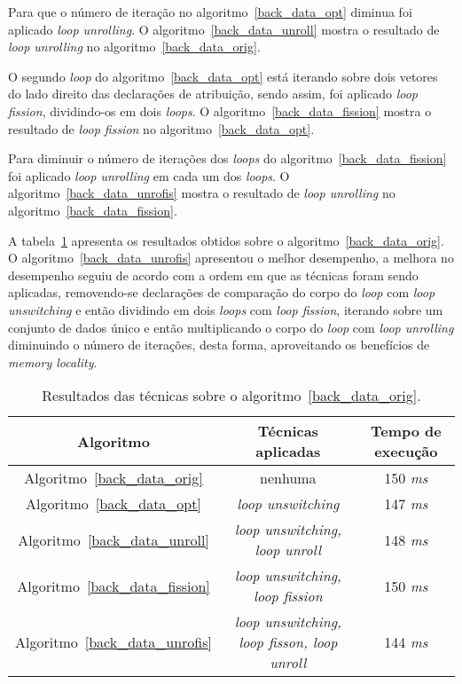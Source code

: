 Para que o número de iteração no algoritmo~\ref{back_data_opt} diminua foi
aplicado \textit{loop unrolling}. O algoritmo~\ref{back_data_unroll} mostra o
resultado de \textit{loop unrolling} no algoritmo~\ref{back_data_orig}.

O segundo \textit{loop} do algoritmo~\ref{back_data_opt} está iterando sobre dois
vetores do lado direito das declarações de atribuição, sendo assim, foi
aplicado \textit{loop fission}, dividindo-os em dois \textit{loops}.
O algoritmo~\ref{back_data_fission} mostra o resultado de \textit{loop fission}
no algoritmo~\ref{back_data_opt}.

Para diminuir o número de iterações dos \textit{loops} do
algoritmo~\ref{back_data_fission} foi aplicado \textit{loop unrolling} em cada um
dos \textit{loops}. O algoritmo~\ref{back_data_unrofis} mostra o resultado de
\textit{loop unrolling} no algoritmo~\ref{back_data_fission}.


A tabela~\ref{tabela_back_data} apresenta os resultados obtidos sobre o
algoritmo~\ref{back_data_orig}.
O algoritmo~\ref{back_data_unrofis} apresentou o melhor desempenho, a melhora no
desempenho seguiu de acordo com a ordem em que as técnicas foram sendo aplicadas, 
removendo-se
declarações de comparação do corpo do \textit{loop} com \textit{loop
unswitching} e então dividindo em dois
\textit{loops} com \textit{loop fission}, iterando sobre um conjunto de dados único 
e então multiplicando o
corpo do \textit{loop} com \textit{loop unrolling} diminuindo o número de iterações, 
desta forma, aproveitando os benefícios de \textit{memory locality}.

\begin{table}[H]
  \caption{Resultados das técnicas sobre o algoritmo~\ref{back_data_orig}.}
  \label{tabela_back_data}
\begin{center}
  \begin{tabular}{c|c|c}
    Algoritmo & Técnicas aplicadas & Tempo de execução\\
    \hline
    Algoritmo~\ref{back_data_orig} & nenhuma & 150 \textit{ms} \\
    \hline
    Algoritmo~\ref{back_data_opt} & \textit{loop unswitching} & 147 \textit{ms} \\
    \hline
    Algoritmo~\ref{back_data_unroll} & \textit{loop unswitching, loop unroll} & 148 \textit{ms} \\
    \hline
    Algoritmo~\ref{back_data_fission} & \textit{loop unswitching, loop fission} & 150 \textit{ms} \\
    \hline
    Algoritmo~\ref{back_data_unrofis} & \textit{loop unswitching, loop fisson, loop unroll} & 144 \textit{ms} \\
    \hline
  \end{tabular}
\end{center}
\end{table}



